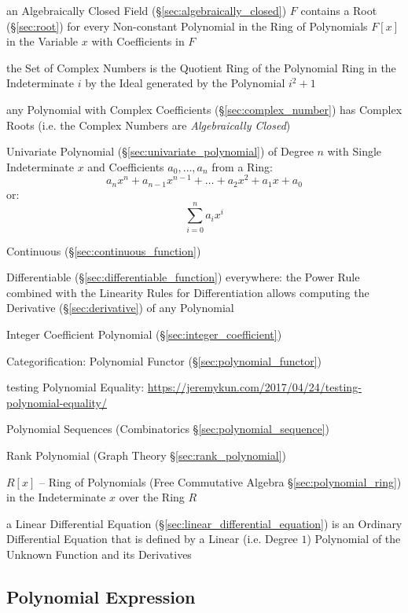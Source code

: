 an Algebraically Closed Field (\S\ref{sec:algebraically_closed}) $F$ contains a
Root (\S\ref{sec:root}) for every Non-constant Polynomial in the Ring
of Polynomials $F[x]$ in the Variable $x$ with
Coefficients in $F$

the Set of Complex Numbers is the Quotient Ring of the Polynomial Ring in the
Indeterminate $i$ by the Ideal generated by the Polynomial $i^2 + 1$

any Polynomial with Complex Coefficients (\S\ref{sec:complex_number}) has
Complex Roots (i.e. the Complex Numbers are \emph{Algebraically Closed})

Univariate Polynomial (\S\ref{sec:univariate_polynomial}) of Degree
$n$ with Single Indeterminate $x$ and Coefficients $a_0, \ldots, a_n$
from a Ring:
\[
  a_n x^n + a_{n-1} x^{n-1} + \ldots + a_2 x^2 + a_1 x + a_0
\]
or:
\[
  \sum_{i=0}^n a_i x^i
\]

Continuous (\S\ref{sec:continuous_function})

Differentiable (\S\ref{sec:differentiable_function}) everywhere: the Power Rule
combined with the Linearity Rules for Differentiation allows computing the
Derivative (\S\ref{sec:derivative}) of any Polynomial

Integer Coefficient Polynomial (\S\ref{sec:integer_coefficient})

Categorification: Polynomial Functor (\S\ref{sec:polynomial_functor})

testing Polynomial Equality:
\url{https://jeremykun.com/2017/04/24/testing-polynomial-equality/}

\fist Polynomial Sequences (Combinatorics \S\ref{sec:polynomial_sequence})

\fist Rank Polynomial (Graph Theory \S\ref{sec:rank_polynomial})

$R[x]$ -- Ring of Polynomials (Free Commutative Algebra
\S\ref{sec:polynomial_ring}) in the Indeterminate $x$ over the Ring $R$

a Linear Differential Equation (\S\ref{sec:linear_differential_equation}) is an
Ordinary Differential Equation that is defined by a Linear (i.e. Degree $1$)
Polynomial of the Unknown Function and its Derivatives



\subsection{Polynomial Expression}\label{sec:polynomial_expression}

